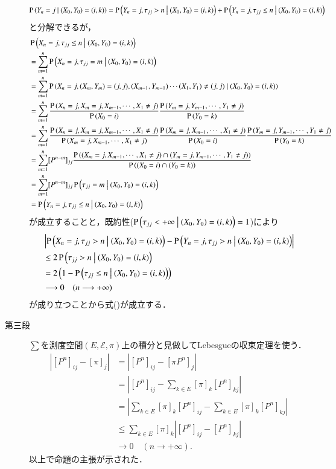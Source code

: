 \begin{prf}
\begin{description}
\begin{align}
			\operatorname{P} \left( Y_n=j \ \middle|\ (X_0,Y_0)=(i,k) \right) &= \operatorname{P} \left( Y_n=j, \tau_{jj} > n \ \middle|\ (X_0,Y_0)=(i,k) \right) + \operatorname{P} \left( Y_n=j, \tau_{jj} \leq n \ \middle|\ (X_0,Y_0)=(i,k) \right)
		\end{align}
		と分解できるが，
		\begin{align}
			&\operatorname{P} \left( X_n=j, \tau_{jj} \leq n \ \middle|\ (X_0,Y_0)=(i,k) \right) \\
			&= \sum_{m=1}^{n} \operatorname{P} \left( X_n=j, \tau_{jj} = m \ \middle|\ (X_0,Y_0)=(i,k) \right) \\
			&= \sum_{m=1}^{n} \operatorname{P} \left( X_n=j, (X_m,Y_m)=(j,j), (X_{m-1},Y_{m-1}) \cdots (X_1,Y_1) \neq (j,j) \ \middle|\ (X_0,Y_0)=(i,k) \right) \\
			&= \sum_{m=1}^{n} \frac{\operatorname{P} \left(X_n=j,X_m=j,X_{m-1},\cdots,X_1 \neq j\right)}{\operatorname{P} \left(X_0=i\right)}
				\frac{\operatorname{P} \left(Y_m=j,Y_{m-1},\cdots,Y_1 \neq j\right)}{\operatorname{P} \left(Y_0=k\right)} \\
			&= \sum_{m=1}^{n} \frac{\operatorname{P} \left(X_n=j,X_m=j,X_{m-1},\cdots,X_1 \neq j\right)}{\operatorname{P} \left(X_m=j,X_{m-1},\cdots,X_1 \neq j\right)}
				\frac{\operatorname{P} \left(X_m=j,X_{m-1},\cdots,X_1 \neq j\right)}{\operatorname{P} \left(X_0=i\right)}\frac{\operatorname{P} \left(Y_m=j,Y_{m-1},\cdots,Y_1 \neq j\right)}{\operatorname{P} \left(Y_0=k\right)} \\
			&= \sum_{m=1}^{n} [P^{n-m}]_{jj} \frac{\operatorname{P} \left((X_m=j,X_{m-1},\cdots,X_1 \neq j)\cap(Y_m=j,Y_{m-1},\cdots,Y_1 \neq j)\right)}{\operatorname{P} \left((X_0=i)\cap(Y_0=k)\right)} \\
			&= \sum_{m=1}^{n} [P^{n-m}]_{jj} \operatorname{P} \left( \tau_{jj} = m \ \middle|\ (X_0,Y_0)=(i,k) \right) \\
			&= \operatorname{P} \left( Y_n=j, \tau_{jj} \leq n \ \middle|\ (X_0,Y_0)=(i,k) \right)
		\end{align}
		が成立することと，既約性($\operatorname{P} \left( \tau_{jj} < +\infty \ \middle|\ (X_0,Y_0)=(i,k) \right) = 1$)により
		\begin{align}
			&\left| \operatorname{P} \left( X_n=j, \tau_{jj} > n \ \middle|\ (X_0,Y_0)=(i,k) \right) - \operatorname{P} \left( Y_n=j, \tau_{jj} > n \ \middle|\ (X_0,Y_0)=(i,k) \right) \right| \\
			&\leq 2\operatorname{P} \left( \tau_{jj} > n \ \middle|\ (X_0,Y_0)=(i,k) \right) \\
			&= 2 \left( 1 - \operatorname{P} \left( \tau_{jj} \leq n \ \middle|\ (X_0,Y_0)=(i,k) \right) \right) \\
			&\longrightarrow 0 \quad (n \longrightarrow +\infty)
		\end{align}
		が成り立つことから式()が成立する．
	\item[第三段]
		$\sum$を測度空間$(E,\mathcal{E},\pi)$上の積分と見做してLebesgueの収束定理を使う．
		\begin{align}
			\left| [P^n]_{ij} - [\pi]_j \right| &= \left| [P^n]_{ij} - [\pi P^n]_j \right| \\
			&= \left| [P^n]_{ij} - \sum_{k \in E}[\pi]_k[P^n]_{kj} \right| \\
			&= \left| \sum_{k \in E}[\pi]_k[P^n]_{ij} - \sum_{k \in E}[\pi]_k[P^n]_{kj} \right| \\
			&\leq \sum_{k \in E}[\pi]_k\left| [P^n]_{ij} - [P^n]_{kj} \right| \\
			&\longrightarrow 0 \quad (n \longrightarrow +\infty).
		\end{align}
		以上で命題の主張が示された．
		\QED
	\end{description}
	\end{prf}
	
